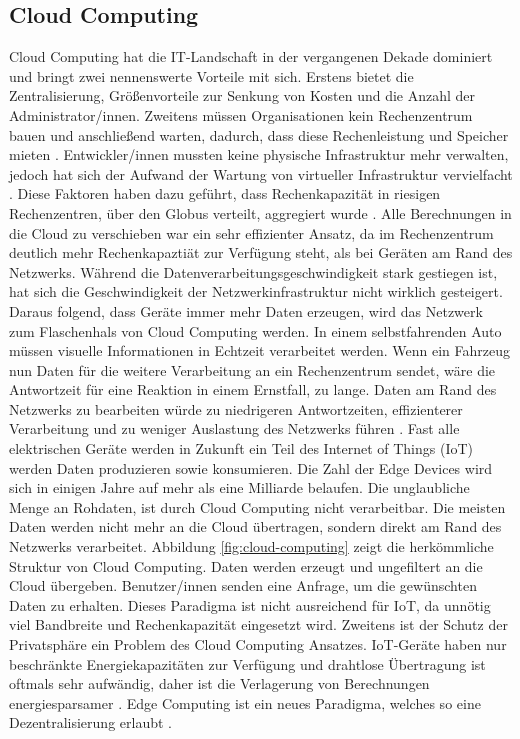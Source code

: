 \documentclass{sigchi}
\begin{document}
\subsection{Cloud Computing}
Cloud Computing hat die IT-Landschaft in der vergangenen Dekade dominiert und bringt zwei nennenswerte Vorteile mit sich. Erstens bietet die Zentralisierung, Größenvorteile zur Senkung von Kosten und die Anzahl der Administrator/innen. Zweitens müssen Organisationen kein Rechenzentrum bauen und anschließend warten, dadurch, dass diese Rechenleistung und Speicher mieten \cite{emergence-edge-computing:2017}. Entwickler/innen mussten keine physische Infrastruktur mehr verwalten, jedoch hat sich der Aufwand der Wartung von virtueller Infrastruktur vervielfacht \cite{cloud-programming-simplified:2019}. Diese Faktoren haben dazu geführt, dass Rechenkapazität in riesigen Rechenzentren, über den Globus verteilt, aggregiert wurde \cite{emergence-edge-computing:2017}. Alle Berechnungen in die Cloud zu verschieben war ein sehr effizienter Ansatz, da im Rechenzentrum deutlich mehr Rechenkapaztiät zur Verfügung steht, als bei Geräten am Rand des Netzwerks. Während die Datenverarbeitungsgeschwindigkeit stark gestiegen ist, hat sich die Geschwindigkeit der Netzwerkinfrastruktur nicht wirklich gesteigert. Daraus folgend, dass Geräte immer mehr Daten erzeugen, wird das Netzwerk zum Flaschenhals von Cloud Computing werden. In einem selbstfahrenden Auto müssen visuelle Informationen in Echtzeit verarbeitet werden. Wenn ein Fahrzeug nun Daten für die weitere Verarbeitung an ein Rechenzentrum sendet, wäre die Antwortzeit für eine Reaktion in einem Ernstfall, zu lange. Daten am Rand des Netzwerks zu bearbeiten würde zu niedrigeren Antwortzeiten, effizienterer Verarbeitung und zu weniger Auslastung des Netzwerks führen \cite{promise-edge-computing:2016}. Fast alle elektrischen Geräte werden in Zukunft ein Teil des Internet of Things (IoT) werden Daten produzieren sowie konsumieren. Die Zahl der Edge Devices wird sich in einigen Jahre auf mehr als eine Milliarde belaufen. Die unglaubliche Menge an Rohdaten, ist durch Cloud Computing nicht verarbeitbar. Die meisten Daten werden nicht mehr an die Cloud übertragen, sondern direkt am Rand des Netzwerks verarbeitet. Abbildung \ref{fig:cloud-computing} zeigt die herkömmliche Struktur von Cloud Computing. Daten werden erzeugt und ungefiltert an die Cloud übergeben. Benutzer/innen senden eine Anfrage, um die gewünschten Daten zu erhalten. Dieses Paradigma ist nicht ausreichend für IoT, da unnötig viel Bandbreite und Rechenkapazität eingesetzt wird. Zweitens ist der Schutz der Privatsphäre ein Problem des Cloud Computing Ansatzes. IoT-Geräte haben nur beschränkte Energiekapazitäten zur Verfügung und drahtlose Übertragung ist oftmals sehr aufwändig, daher ist die Verlagerung von Berechnungen energiesparsamer \cite{vision-challenges:2016}. Edge Computing ist ein neues Paradigma, welches so eine Dezentralisierung erlaubt \cite{emergence-edge-computing:2017}. 
\end{document}
